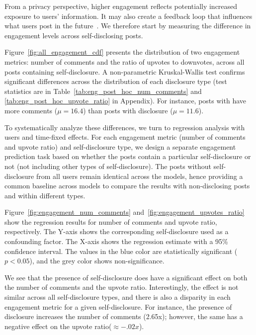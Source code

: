 From a privacy perspective, higher engagement reflects potentially increased exposure to users' information. It may also create a feedback loop that influences what users post in the future~\cite{haq_short_2022}.
We therefore start by measuring the difference in engagement levels across self-disclosing posts. 



Figure~\ref{fig:all_engagement_cdf} presents the distribution of two engagement metrics: \one number of comments %
and \two the ratio of upvotes to downvotes, across all posts containing self-disclosure. 
A non-parametric Kruskal-Wallis test confirms significant differences across the distribution of each disclosure type (test statistics are in Table~\ref{tab:eng_post_hoc_num_comments} and \ref{tab:eng_post_hoc_upvote_ratio} in Appendix). 
For instance, posts with \sexualOrientation have more comments ($\mu = 16.4$) than posts with \job disclosure ($\mu = 11.6$). 

To systematically analyze these differences, we turn to regression analysis with users and time-fixed effects. For each engagement metric (number of comments and upvote ratio) and self-disclosure type, we design a separate engagement prediction task based on whether the posts contain a particular self-disclosure or not (not including other types of self-disclosure). The posts without self-disclosure from all users remain identical across the models, hence providing a common baseline across models to compare the results with non-disclosing posts and within different types.

Figure~\ref{fig:engagement_num_comments} and~\ref{fig:engagement_upvotes_ratio} show the regression results for number of comments and upvote ratio, respectively. The Y-axis shows the corresponding self-disclosure used as a confounding factor. The X-axis shows the regression estimate with a 95\% confidence interval. The values in the blue color are statistically significant ($p<0.05$), and the grey color shows non-significance.

We see that the presence of self-disclosure does have a significant effect on both the number of comments and the upvote ratio. Interestingly, the effect is not similar across all self-disclosure types, and there is also a disparity in each engagement metric for a given self-disclosure. For instance, the presence of \sexualOrientation disclosure increases the number of comments (2.65x); however, the same has a negative effect on the upvote ratio($\approx-.02x$). 

